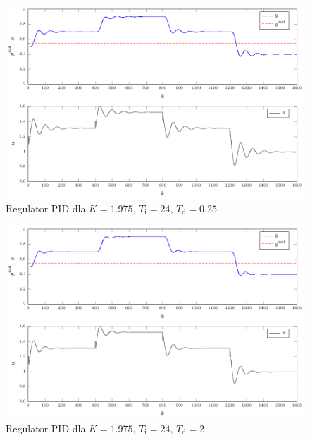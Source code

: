 \begin{figure}[tb] 
\centering 
\includegraphics[scale=1]{rysunki/zapisz_pdf/PID_K=1.975_Ti=24.00_Td=0.25.pdf} 
\caption{Regulator PID dla $K=\num{1.975}$, $T_{\mathrm{i}}=24$, $T_{\mathrm{d}}=\num{0.25}$} 
\label{r_pgfplots_PID_K=1.975_Ti=24.00_Td=0.25} 
\end{figure}

\begin{figure}[tb] 
\centering 
\includegraphics[scale=1]{rysunki/zapisz_pdf/PID_K=1.975_Ti=24.00_Td=2.00.pdf} 
\caption{Regulator PID dla $K=\num{1.975}$, $T_{\mathrm{i}}=24$, $T_{\mathrm{d}}=2$} 
\label{r_pgfplots_PID_K=1.975_Ti=24.00_Td=2.00} 
\end{figure}


